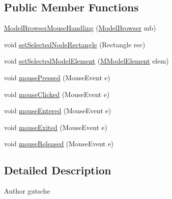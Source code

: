 \subsection*{Public Member Functions}
\begin{DoxyCompactItemize}
\item 
\hyperlink{classorg_1_1tzi_1_1use_1_1gui_1_1views_1_1diagrams_1_1event_1_1_model_browser_mouse_handling_a36e7fb3aa0f1246cc76af55d6e7290a4}{Model\-Browser\-Mouse\-Handling} (\hyperlink{classorg_1_1tzi_1_1use_1_1gui_1_1main_1_1_model_browser}{Model\-Browser} mb)
\item 
void \hyperlink{classorg_1_1tzi_1_1use_1_1gui_1_1views_1_1diagrams_1_1event_1_1_model_browser_mouse_handling_a4748d10ebcb61a217383d44e0cb74e54}{set\-Selected\-Node\-Rectangle} (Rectangle rec)
\item 
void \hyperlink{classorg_1_1tzi_1_1use_1_1gui_1_1views_1_1diagrams_1_1event_1_1_model_browser_mouse_handling_a82253e6c2c7bc0e04cee7dff800f344f}{set\-Selected\-Model\-Element} (\hyperlink{interfaceorg_1_1tzi_1_1use_1_1uml_1_1mm_1_1_m_model_element}{M\-Model\-Element} elem)
\item 
void \hyperlink{classorg_1_1tzi_1_1use_1_1gui_1_1views_1_1diagrams_1_1event_1_1_model_browser_mouse_handling_a8763a4c714fd10038b337b80b54208ae}{mouse\-Pressed} (Mouse\-Event e)
\item 
void \hyperlink{classorg_1_1tzi_1_1use_1_1gui_1_1views_1_1diagrams_1_1event_1_1_model_browser_mouse_handling_a408a23eefecfd92cdcdee0a798b78e4a}{mouse\-Clicked} (Mouse\-Event e)
\item 
void \hyperlink{classorg_1_1tzi_1_1use_1_1gui_1_1views_1_1diagrams_1_1event_1_1_model_browser_mouse_handling_a181f9bc0a56248ec5062ee5092e8addd}{mouse\-Entered} (Mouse\-Event e)
\item 
void \hyperlink{classorg_1_1tzi_1_1use_1_1gui_1_1views_1_1diagrams_1_1event_1_1_model_browser_mouse_handling_a6ca27793b8d9a781bf354f077fd0765a}{mouse\-Exited} (Mouse\-Event e)
\item 
void \hyperlink{classorg_1_1tzi_1_1use_1_1gui_1_1views_1_1diagrams_1_1event_1_1_model_browser_mouse_handling_aa66f12921a1944eaf10d6a064e1a09d8}{mouse\-Released} (Mouse\-Event e)
\end{DoxyCompactItemize}


\subsection{Detailed Description}
\begin{DoxyAuthor}{Author}
gutsche 
\end{DoxyAuthor}


